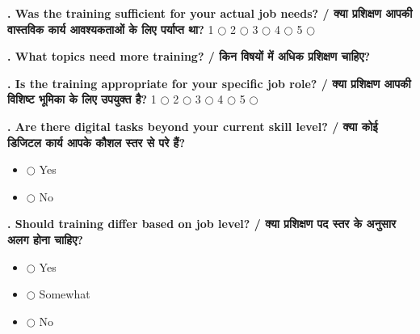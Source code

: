 \documentclass[11pt,a4paper]{article}
\newcounter{qcounter}
\begin{document}
\textbf{. Was the training sufficient for your actual job needs? / क्या प्रशिक्षण आपकी वास्तविक कार्य आवश्यकताओं के लिए पर्याप्त था?}
\vspace{0.1cm}
\vspace{0.1cm}
1 $\bigcirc$ \hspace{1cm} 2 $\bigcirc$ \hspace{1cm} 3 $\bigcirc$ \hspace{1cm} 4 $\bigcirc$ \hspace{1cm} 5 $\bigcirc$
\vspace{0.4cm}

\textbf{. What topics need more training? / किन विषयों में अधिक प्रशिक्षण चाहिए?}
\vspace{0.1cm}
\vspace{0.2cm}
\hrulefill\par\vspace{0.6cm}\hrulefill\par\vspace{0.6cm}\hrulefill
\vspace{0.4cm}

\textbf{. Is the training appropriate for your specific job role? / क्या प्रशिक्षण आपकी विशिष्ट भूमिका के लिए उपयुक्त है?}
\vspace{0.1cm}
\vspace{0.1cm}
1 $\bigcirc$ \hspace{1cm} 2 $\bigcirc$ \hspace{1cm} 3 $\bigcirc$ \hspace{1cm} 4 $\bigcirc$ \hspace{1cm} 5 $\bigcirc$
\vspace{0.4cm}

\textbf{. Are there digital tasks beyond your current skill level? / क्या कोई डिजिटल कार्य आपके कौशल स्तर से परे हैं?}
\vspace{0.1cm}
\begin{itemize}[label=, itemsep=0.1cm, leftmargin=0.5cm]
    \item $\bigcirc$ Yes
    \item $\bigcirc$ No
\end{itemize}
\vspace{0.2cm}

\textbf{. Should training differ based on job level? / क्या प्रशिक्षण पद स्तर के अनुसार अलग होना चाहिए?}
\vspace{0.1cm}
\begin{itemize}[label=, itemsep=0.1cm, leftmargin=0.5cm]
    \item $\bigcirc$ Yes
    \item $\bigcirc$ Somewhat
    \item $\bigcirc$ No
\end{itemize}
\vspace{0.2cm}
\end{document}
